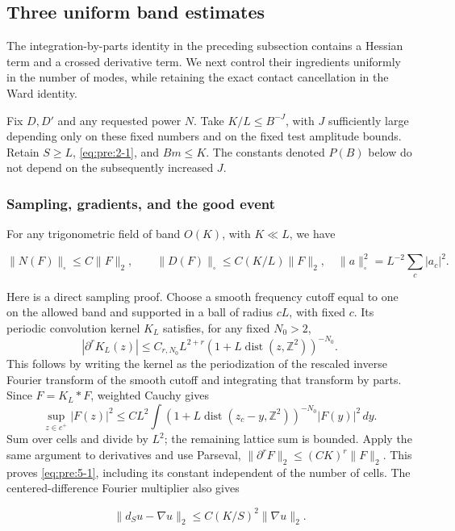 \subsection{Three uniform band estimates}\label{pre:bands}

The integration-by-parts identity in the preceding subsection contains
a Hessian term and a crossed derivative term. We next control their
ingredients uniformly in the number of modes, while retaining the exact
contact cancellation in the Ward identity.

Fix \(D,D'\) and any requested power \(N\). Take \(K/L\leq B^{-J}\), with \(J\) sufficiently large depending only on these fixed numbers and on the fixed test amplitude bounds. Retain \(S\geq L\), \eqref{eq:pre:2-1}, and \(Bm\leq K\). The constants denoted \(P(B)\) below do not depend on the subsequently increased \(J\).

\subsubsection{Sampling, gradients, and the good event}\label{pre:part-5-1}

For any trigonometric field of band \(O(K)\), with \(K\ll L\), we have

\begin{equation}
\|N(F)\|_\square\leq C\|F\|_2,\qquad
\|D(F)\|_\square\leq C(K/L)\|F\|_2,
\quad
\|a\|_\square^2=L^{-2}\sum_c|a_c|^2.
\label{eq:pre:5-1}
\end{equation}

Here is a direct sampling proof. Choose a smooth frequency cutoff equal to
one on the allowed band and supported in a ball of radius \(cL\), with fixed
\(c\). Its periodic convolution kernel \(K_L\) satisfies, for any fixed
\(N_0>2\),
\[
 |\partial^r K_L(z)|\leq C_{r,N_0}L^{2+r}
 (1+L\operatorname{dist}(z,\mathbb Z^2))^{-N_0}.
\]
This follows by writing the kernel as the periodization of the rescaled
inverse Fourier transform of the smooth cutoff and integrating that
transform by parts. Since \(F=K_L*F\), weighted Cauchy gives
\[
 \sup_{z\in c^+}|F(z)|^2\leq
 CL^2\int (1+L\operatorname{dist}(z_c-y,\mathbb Z^2))^{-N_0}|F(y)|^2\,dy.
\]
Sum over cells and divide by \(L^2\); the remaining lattice sum is bounded.
Apply the same argument to derivatives and use Parseval,
\(\|\partial^rF\|_2\leq(CK)^r\|F\|_2\). This proves
\eqref{eq:pre:5-1}, including its constant independent of the number of cells.
The centered-difference Fourier multiplier also gives

\begin{equation}
\|d_Su-\nabla u\|_2\leq C(K/S)^2\|\nabla u\|_2.
\label{eq:pre:5-2}
\end{equation}

